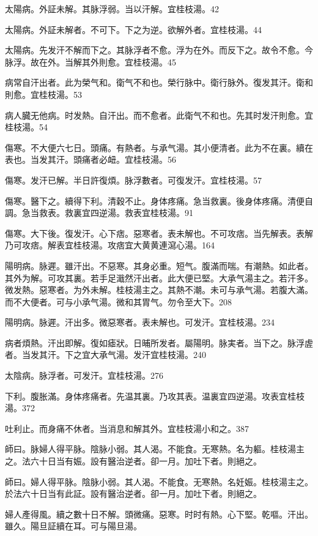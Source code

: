 太陽病。外証未解。其脉浮弱。当以汗解。宜桂枝湯。42

太陽病。外証未解者。不可下。下之为逆。欲解外者。宜桂枝湯。44

太陽病。先发汗不解而下之。其脉浮者不愈。浮为在外。而反下之。故令不愈。今脉浮。故在外。当解其外則愈。宜桂枝湯。45

病常自汗出者。此为榮气和。衛气不和也。榮行脉中。衛行脉外。復发其汗。衛和則愈。宜桂枝湯。53

病人臓无他病。时发熱。自汗出。而不愈者。此衛气不和也。先其时发汗則愈。宜桂枝湯。54

傷寒。不大便六七日。頭痛。有熱者。与承气湯。其小便清者。此为不在裏。續在表也。当发其汗。頭痛者必衄。宜桂枝湯。56

傷寒。发汗已解。半日許復煩。脉浮數者。可復发汗。宜桂枝湯。57

傷寒。醫下之。續得下利。清穀不止。身体疼痛。急当救裏。後身体疼痛。清便自調。急当救表。救裏宜四逆湯。救表宜桂枝湯。91

傷寒。大下後。復发汗。心下痞。惡寒者。表未解也。不可攻痞。当先解表。表解乃可攻痞。解表宜桂枝湯。攻痞宜大黄黄連瀉心湯。164

陽明病。脉遲。雖汗出。不惡寒。其身必重。短气。腹滿而喘。有潮熱。如此者。其外为解。可攻其裏。若手足濈然汗出者。此大便已堅。{\khaaitp 大}承气湯主之。若汗多。微发熱。惡寒者。为外未解。{\khaaitp 桂枝湯主之。}其熱不潮。未可与承气湯。若腹大滿。而不大便者。可与小承气湯。微和其胃气。勿令至大下。208

陽明病。脉遲。汗出多。微惡寒者。表未解也。可发汗。宜桂枝湯。234

病者煩熱。汗出即解。復如瘧狀。日晡所发者。屬陽明。脉実者。当下之。脉浮虗者。当发其汗。下之宜{\khaaitp 大}承气湯。发汗宜桂枝湯。240

太陰病。脉浮者。可发汗。宜桂枝湯。276

下利。腹{\khaaitp 胀}滿。身体疼痛者。先温其裏。乃攻其表。温裏宜四逆湯。攻表宜桂枝湯。372

吐利止。而身痛不休者。当消息和解其外。宜桂枝湯小和之。387

師曰。脉婦人得平脉。陰脉小弱。其人渴。不能食。无寒熱。名为軀。桂枝湯主之。法六十日当有娠。設有醫治逆者。卻一月。加吐下者。則絕之。{\wuben}

師曰。婦人得平脉。陰脉小弱。其人渴。不能食。无寒熱。名妊娠。桂枝湯主之。於法六十日当有此証。設有醫治逆者。卻一月。加吐下者。則絕之。{\dengben}

婦人產得風。續之數十日不解。頭微痛。惡寒。时时有熱。心下堅。乾嘔。汗出。雖久。陽旦証續在耳。可与陽旦湯。{\wuben}

